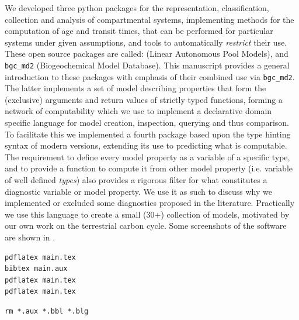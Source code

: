 We developed three python packages for the representation, classification, collection and analysis  of compartmental systems, implementing methods for the computation of age and transit times, that can be performed for particular systems under given assumptions, and tools to automatically \emph{restrict} their use.
These open source packages are called: 
\LAPM{} (Linear Autonomous Pool Models),
\CompartmentalSystems{}  and
\texttt{bgc\_md2} (Biogeochemical Model Database).
This manuscript provides a general introduction to these packages 
with emphasis of their combined use via \texttt{bgc\_md2}.
The latter implements a set of model describing properties that form the (exclusive) arguments and return values of strictly typed functions, forming a network of computability which we use 
to implement a declarative domain specific language for model creation, inspection, querying and thus comparison.
To facilitate this we implemented a fourth package \ComputabilityGraphs{} based upon the  type hinting syntax of modern \python{} versions, extending its use to predicting what is computable.   
The requirement to define every model property as a variable of a specific
type, and to provide a function to compute it from other model property (i.e.
variable of well defined \emph{types}) also provides a rigorous filter for what
constitutes a diagnostic variable or model property. 
We use it as such to discuss why we implemented or excluded some diagnostics proposed in the literature.
Practically we use this language to create a small
(30+) collection of models, motivated by our own work on the terrestrial carbon
cycle.  Some screenshots of the software are shown in . 
\begin{verbatim}
pdflatex main.tex
bibtex main.aux
pdflatex main.tex
pdflatex main.tex
\end{verbatim}
\begin{verbatim}
rm *.aux *.bbl *.blg
\end{verbatim}


